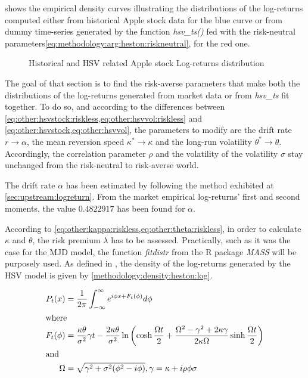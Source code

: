 \documentclass[12pt]{report}
\begin{document}
 shows the empirical density curves illustrating the distributions of the log-returns computed either from historical Apple stock data for the blue curve or from dummy time-series generated by the function \textit{hsv\_ts()} fed with the risk-neutral parameters\ref{eq:methodology:arg:heston:riskneutral}, for the red one.


\begin{figure}[ht]
  \centering
  
  \caption{Historical and HSV related Apple stock Log-returns distribution}
  \label{p:methodology:density:aapl:heston:riskneutral}
\end{figure}


The goal of that section is to find the risk-averse parameters that make both the distributions of the log-returns generated from market data or from \textit{hsv\_ts} fit together.
To do so, and according to the differences between \cref{eq:other:hsvstock:riskless,eq:other:hsvvol:riskless} and \cref{eq:other:hsvstock,eq:other:hsvvol}, the parameters to modify are the drift rate $r \to \alpha$, the mean reversion speed $\kappa^{*} \to \kappa$ and the long-run volatility $\theta^* \to \theta$.
Accordingly, the correlation parameter $\rho$ and the volatility of the volatility $\sigma$ stay unchanged from the risk-neutral to risk-averse world.

The drift rate $\alpha$ has been estimated by following the method exhibited at \cref{sec:upstream:logreturn}. From the market empirical log-returns' first and second moments, the value $0.4822917$ has been found for $\alpha$.

According to \cref{eq:other:kappa:riskless,eq:other:theta:riskless}, in order to  calculate $\kappa$ and $\theta$, the risk premium $\lambda$ has to be assessed.
Practically, such as it was the case for the MJD model, the function \textit{fitdistr} from the R package \textit{MASS} will be purposely used. 
As defined in \citet{Adrian}, the density of the log-returns generated by the HSV model is given by \cref{methodology:density:heston:log}.

\begin{align}
P_t(x) &= \frac{1}{2 \pi} \int_{-\infty}^{\infty} e^{i \phi x + F_t(\phi)} d\phi \label{methodology:density:heston:log} \\
\intertext{where}
F_t(\phi) &= \frac{\kappa \theta}{\sigma^2} \gamma t -
  \frac{2 \kappa \theta}{\sigma ^2} \ln\left(
    \cosh \frac{\Omega t}{2} +
    \frac{\Omega^2 - \gamma^2 +2 \kappa \gamma}{2 \kappa \Omega} \sinh \frac{\Omega t}{2}
  \right) \notag \\
\intertext{and}
\Omega &= \sqrt{\gamma^2 + \sigma^2 (\phi^2 - i\phi)}, \notag
\gamma = \kappa + i \rho \phi \sigma \notag
\end{align}
\end{document}
